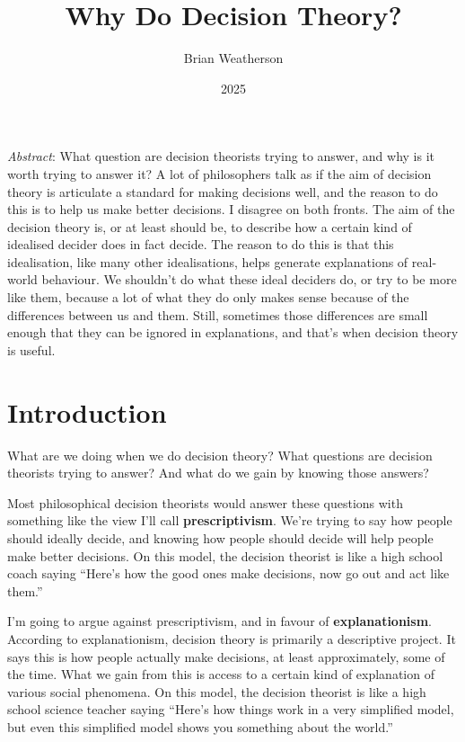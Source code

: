 \documentclass[
  11pt,
  letterpaper,
  DIV=11,
  numbers=noendperiod,
  twoside]{scrartcl}
\title{Why Do Decision Theory?}
\author{Brian Weatherson}
\date{2025}
\renewenvironment{abstract}
 {\vspace{-1.25cm}
 \quotation\small\noindent\emph{Abstract}:}
 {\endquotation}
\renewenvironment{abstract}
 {\quotation\small\noindent\emph{Abstract}:}
 {\endquotation\vspace{-0.02cm}}
\begin{document}
\maketitle
\begin{abstract}
What question are decision theorists trying to answer, and why is it
worth trying to answer it? A lot of philosophers talk as if the aim of
decision theory is articulate a standard for making decisions well, and
the reason to do this is to help us make better decisions. I disagree on
both fronts. The aim of the decision theory is, or at least should be,
to describe how a certain kind of idealised decider does in fact decide.
The reason to do this is that this idealisation, like many other
idealisations, helps generate explanations of real-world behaviour. We
shouldn't do what these ideal deciders do, or try to be more like them,
because a lot of what they do only makes sense because of the
differences between us and them. Still, sometimes those differences are
small enough that they can be ignored in explanations, and that's when
decision theory is useful.
\end{abstract}


\section{Introduction}\label{sec-intro}

What are we doing when we do decision theory? What questions are
decision theorists trying to answer? And what do we gain by knowing
those answers?

Most philosophical decision theorists would answer these questions with
something like the view I'll call \textbf{prescriptivism}. We're trying
to say how people should ideally decide, and knowing how people should
decide will help people make better decisions. On this model, the
decision theorist is like a high school coach saying ``Here's how the
good ones make decisions, now go out and act like them.''

I'm going to argue against prescriptivism, and in favour of
\textbf{explanationism}. According to explanationism, decision theory is
primarily a descriptive project. It says this is how people actually
make decisions, at least approximately, some of the time. What we gain
from this is access to a certain kind of explanation of various social
phenomena. On this model, the decision theorist is like a high school
science teacher saying ``Here's how things work in a very simplified
model, but even this simplified model shows you something about the
world.''
\end{document}
